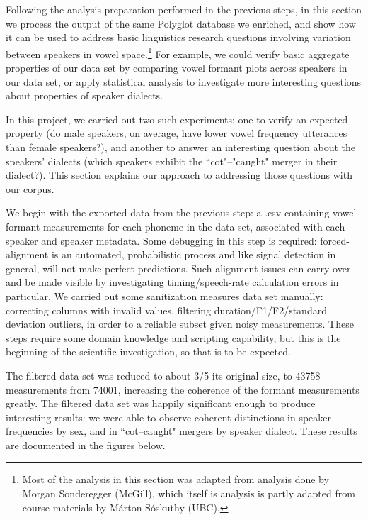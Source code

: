 \documentclass[11pt]{article}
\begin{document}
Following the analysis preparation performed in the previous steps, in this section we process the output of the same Polyglot database we enriched, and show how it can be used to address basic linguistics research questions involving variation between speakers in vowel space.\footnote{Most of the analysis in this section was adapted from analysis done by Morgan Sonderegger (McGill), which itself is analysis is partly adapted from course materials by Márton Sóskuthy (UBC).} For example, we could verify basic aggregate properties of our data set by comparing vowel formant plots across speakers in our data set, or apply statistical analysis to investigate more interesting questions about properties of speaker dialects.

In this project, we carried out two such experiments: one to verify an expected property (do male speakers, on average, have lower vowel frequency utterances than female speakers?), and another to answer an interesting question about the speakers' dialects (which speakers exhibit the ``cot"--"caught" merger in their dialect?). This section explains our approach to addressing those questions with our corpus.

We begin with the exported data from the previous step: a .csv containing vowel formant measurements for each phoneme in the data set, associated with each speaker and speaker metadata. Some debugging in this step is required: forced-alignment is an automated, probabilistic process and like signal detection in general, will not make perfect predictions. Such alignment issues can carry over and be made visible by investigating timing/speech-rate calculation errors in particular. We carried out some sanitization measures data set manually: correcting columns with invalid values, filtering duration/F1/F2/standard deviation outliers, in order to a reliable subset given noisy measurements. These steps require some domain knowledge and scripting capability, but this is the beginning of the scientific investigation, so that is to be expected.

The filtered data set was reduced to about 3/5 its original size, to 43758 measurements from 74001, increasing the coherence of the formant measurements greatly. The filtered data set was happily significant enough to produce interesting results: we were able to observe coherent distinctions in speaker frequencies by sex, and in ``cot--caught" mergers by speaker dialect. These results are documented in the \hyperlink{fig:sex_formant}{figures} \hyperlink{fig:dialect-analysis}{below}.
\end{document}
